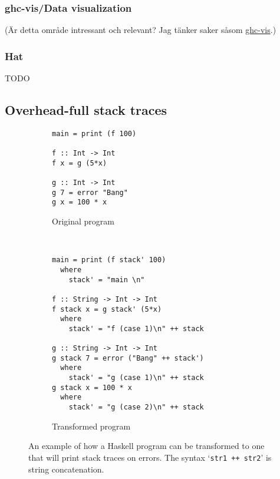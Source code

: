 \subsubsection{ghc-vis/Data visualization}

(Är detta område intressant och relevant? Jag tänker saker såsom
\href{http://felsin9.de/nnis/ghc-vis/}{ghc-vis}.)

\subsubsection{Hat}

TODO

\subsection{Overhead-full stack traces}

\begin{figure}
        \begin{subfigure}[t]{0.5\textwidth}
            \begin{verbatim}
main = print (f 100)

f :: Int -> Int
f x = g (5*x)

g :: Int -> Int
g 7 = error "Bang"
g x = 100 * x
            \end{verbatim}
            \caption{Original program}
        \end{subfigure}
        ~ %
        \begin{subfigure}[t]{0.5\textwidth}
          \begin{verbatim}
main = print (f stack' 100)
  where
    stack' = "main \n"

f :: String -> Int -> Int
f stack x = g stack' (5*x)
  where
    stack' = "f (case 1)\n" ++ stack

g :: String -> Int -> Int
g stack 7 = error ("Bang" ++ stack')
  where
    stack' = "g (case 1)\n" ++ stack
g stack x = 100 * x
  where
    stack' = "g (case 2)\n" ++ stack
          \end{verbatim}
          \caption{Transformed program}
        \end{subfigure}
        \caption{An example of how a Haskell program can be transformed to one
          that will print stack traces on errors. The syntax `\texttt{str1 ++
            str2}' is string concatenation.
        }\label{fig:transformation}
\end{figure}

